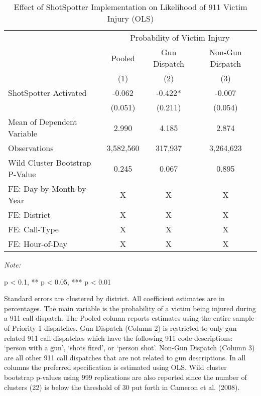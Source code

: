 \begin{table}[H]

\caption{\label{victim_table}Effect of ShotSpotter Implementation on Likelihood of 911 Victim Injury (OLS)}
\centering
\begin{threeparttable}
\fontsize{11}{13}\selectfont
\begin{tabular}[t]{>{\raggedright\arraybackslash}p{8cm}ccc}
\toprule
\multicolumn{1}{c}{ } & \multicolumn{3}{c}{Probability of Victim Injury} \\
\cmidrule(l{3pt}r{3pt}){2-4}
\multicolumn{1}{c}{ } & \multicolumn{1}{c}{Pooled} & \multicolumn{1}{c}{Gun Dispatch} & \multicolumn{1}{c}{Non-Gun Dispatch} \\
\cmidrule(l{3pt}r{3pt}){2-2} \cmidrule(l{3pt}r{3pt}){3-3} \cmidrule(l{3pt}r{3pt}){4-4}
  & (1) & (2) & (3)\\
\midrule
ShotSpotter Activated & -0.062 & -0.422* & -0.007\\
 & (0.051) & (0.211) & (0.054)\\
Mean of Dependent Variable & 2.990 & 4.185 & 2.874\\
Observations & 3,582,560 & 317,937 & 3,264,623\\
Wild Cluster Bootstrap P-Value & 0.245 & 0.067 & 0.895\\
\midrule
\addlinespace
FE: Day-by-Month-by-Year & X & X & X\\
FE: District & X & X & X\\
FE: Call-Type & X & X & X\\
FE: Hour-of-Day & X & X & X\\
\bottomrule
\end{tabular}
\begin{tablenotes}
\item \textit{Note: } 
\item * p < 0.1, ** p < 0.05, *** p < 0.01
\item Standard errors are clustered by district. All coefficient                      estimates are in percentages.                      The main variable is the probability of a victim being                      injured during a 911 call dispatch.                      The Pooled column reports estimates using the entire sample of Priority 1                      dispatches.                      Gun Dispatch (Column 2) is restricted to only gun-related 911 call dispatches which                      have the following 911 code descriptions:                      `person with a gun',                  `shots fired', or `person shot'. Non-Gun Dispatch (Column 3) are all other                      911 call dispatches that are not related to gun descriptions. In all columns the preferred specification is estimated using                      OLS. Wild cluster bootstrap p-values using 999 replications are also reported                  since the number of clusters (22) is below the threshold of 30 put forth in                  Cameron et al. (2008).                                    
\end{tablenotes}
\end{threeparttable}
\end{table}
